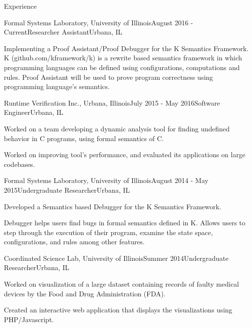 \documentclass{resume} %
\begin{document}
\begin{rSection}{Experience}

\begin{rSubsection}{Formal Systems Laboratory, University of Illinois}{August 2016 - Current}{Researcher Assistant}{Urbana, IL}
\item Implementing a Proof Assistant/Proof Debugger for the K Semantics Framework. K (github.com/kframework/k) is a rewrite based
    semantics framework in which programming languages can be defined using configurations, computations and rules.
    Proof Assistant will be used to prove program correctness using programming language's semantics.
\end{rSubsection}

\begin{rSubsection}{Runtime Verification Inc., Urbana, Illinois}{July 2015 - May 2016}{Software Engineer}{Urbana, IL}
\item Worked on a team developing a dynamic analysis tool for finding undefined behavior in C programs, using formal semantics of C.
\item Worked on improving tool's performance, and evaluated its applications on large codebases.
\end{rSubsection}

\begin{rSubsection}{Formal Systems Laboratory, University of Illinois}{August 2014 - May 2015}{Undergraduate Researcher}{Urbana, IL}
\item Developed a Semantics based Debugger for the K Semantics Framework.
\item Debugger helps users find bugs in formal semantics defined in K. Allows users to step
through the execution of their program, examine the state space, configurations, and rules
among other features.
\end{rSubsection}

\begin{rSubsection}{Coordinated Science Lab, University of Illinois}{Summer 2014}{Undergraduate Researcher}{Urbana, IL}
\item Worked on visualization of a large dataset containing records of faulty medical devices by the Food and Drug Administration (FDA).
\item Created an interactive web application that displays the visualizations using PHP/Javascript.
\end{rSubsection}



\end{rSection}
\end{document}
